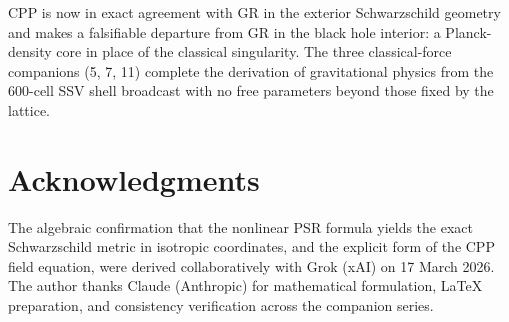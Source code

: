\documentclass[12pt]{article}
\begin{document}
CPP is now in exact agreement with GR in the exterior Schwarzschild
geometry and makes a falsifiable departure from GR in the black hole
interior: a Planck-density core in place of the classical singularity.
The three classical-force companions (5, 7, 11) complete the derivation
of gravitational physics from the 600-cell SSV shell broadcast with
no free parameters beyond those fixed by the lattice.

\section*{Acknowledgments}

The algebraic confirmation that the nonlinear PSR formula yields
the exact Schwarzschild metric in isotropic coordinates, and the
explicit form of the CPP field equation, were derived collaboratively
with Grok (xAI) on 17 March 2026.  The author thanks Claude
(Anthropic) for mathematical formulation, LaTeX preparation, and
consistency verification across the companion series.
\end{document}
